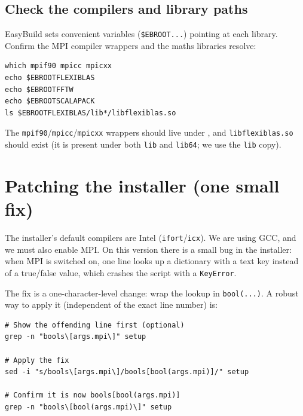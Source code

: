 \documentclass[12pt,a4paper]{article}
\begin{document}
\subsection{Check the compilers and library paths}

EasyBuild sets convenient variables (\texttt{\$EBROOT...}) pointing at each
library. Confirm the MPI compiler wrappers and the maths libraries resolve:

\begin{lstlisting}[style=shell]
which mpif90 mpicc mpicxx
echo $EBROOTFLEXIBLAS
echo $EBROOTFFTW
echo $EBROOTSCALAPACK
ls $EBROOTFLEXIBLAS/lib*/libflexiblas.so
\end{lstlisting}

The \texttt{mpif90}/\texttt{mpicc}/\texttt{mpicxx} wrappers should live
under , and
\texttt{libflexiblas.so} should exist (it is present under both
\texttt{lib} and \texttt{lib64}; we use the \texttt{lib} copy).

\section{Patching the installer (one small fix)}
\label{sec:patch}
\setcounter{subsection}{-1}

The installer's default compilers are Intel (\texttt{ifort}/\texttt{icx}).
We are using GCC, and we must also enable MPI. On this version there is a small
bug in the installer: when MPI is switched on, one line looks up a dictionary with
a text key instead of a true/false value, which crashes the script with a
\texttt{KeyError}.

The fix is a one-character-level change: wrap the lookup in \texttt{bool(...)}.
A robust way to apply it (independent of the exact line number) is:

\noindent %
\begin{minipage}{\linewidth}
\begin{lstlisting}[style=shell]
# Show the offending line first (optional)
grep -n "bools\[args.mpi\]" setup

# Apply the fix
sed -i "s/bools\[args.mpi\]/bools[bool(args.mpi)]/" setup

# Confirm it is now bools[bool(args.mpi)]
grep -n "bools\[bool(args.mpi)\]" setup
\end{lstlisting}
\end{minipage}
\end{document}
